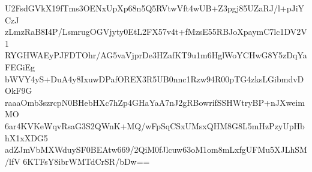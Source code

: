 U2FsdGVkX19fTms3OENxUpXp68n5Q5RVtwVft4wUB+Z3pgj85UZaRJ/l+pJiYCzJ
zLmzRaB8I4P/LsmrugOGVjyty0EtL2FX57v4t+fMzsE55RBJoXpaymC7lc1DV2V1
RYGHWAEyPJFDTOhr/AG5vaVjprDe3HZafKT9u1m6HglWoYCHwG8Y5zDqYaFEGiEg
bWVY4yS+DuA4y8IxuwDPafOREX3R5UB0nnc1Rzw94R00pTG4zksLGibmdvDOkF9G
raaaOmb3szrcpN0BHebHXc7hZp4GHaYaA7nJ2gRBowrifSSHWtryBP+nJXweimMO
6ar4KVKeWqvRsaG3S2QWnK+MQ/wFpSqCSxUMsxQHM8G8L5mHzPzyUpHbhX1xXDG5
adZJmVbMXWduySF0BEAtw669/2QiM0fJlcuw63oM1om8mLxfgUFMu5XJLhSM/lfV
6KTFsY8ibrWMTdCrSR/bDw==
